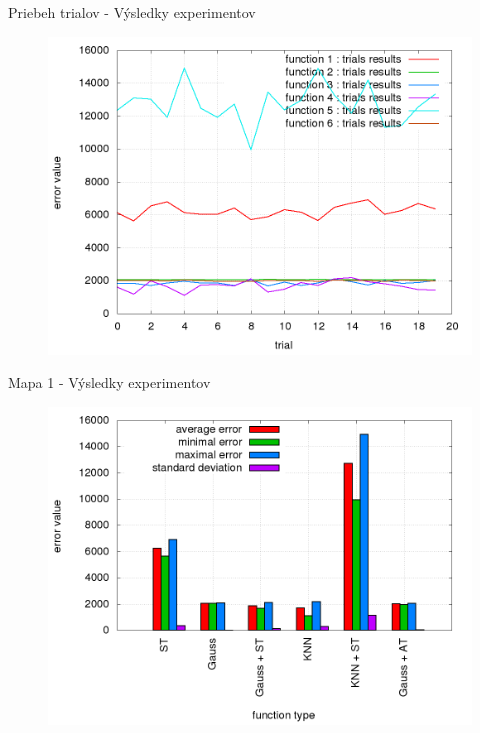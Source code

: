 Priebeh trialov - Výsledky experimentov

\begin{figure}[!htb]
\centering
\includegraphics[scale=.4]{../../results_q_learning/map_1/trials_average_results_progress.png}
\end{figure}




Mapa 1 - Výsledky experimentov

\begin{figure}[!htb]
\centering
\includegraphics[scale=.4]{../../results_q_learning/map_1/trials_average_results.png}
\end{figure}



